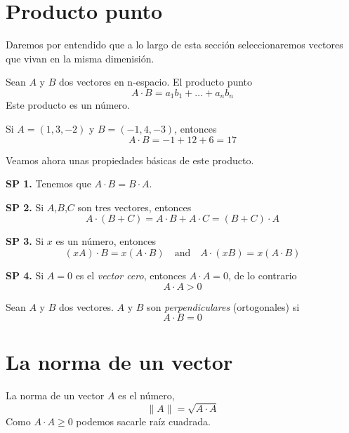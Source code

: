 \section{Producto punto}

Daremos por entendido que a lo largo de esta sección seleccionaremos vectores que vivan en la misma dimenisión.

\begin{definition}
    Sean $A$ y $B$ dos vectores en n-espacio. El producto punto
    $$ A \cdot B = a_{1}b_{1} + \ldots + a_{n}b_{n} $$
    Este producto es un número.
\end{definition}

\begin{myExample}
    Si $A=(1,3,-2)$ y $B=(-1,4,-3)$, entonces
    $$ A \cdot B = -1 + 12 + 6 = 17 $$
\end{myExample}

Veamos ahora unas propiedades básicas de este producto.

\begin{labeling}{}
    \item [\textbf{SP 1.}] Tenemos que $A \cdot B = B \cdot A$.
    \item [\textbf{SP 2.}] Si $A$,$B$,$C$ son tres vectores, entonces
        $$ A \cdot (B+C) = A \cdot B + A \cdot C = (B+C) \cdot A$$
    \item [\textbf{SP 3.}] Si $x$ es un número, entonces
        $$ (xA) \cdot B = x(A \cdot B) \quad \text{and} \quad A \cdot (xB) = x(A \cdot B) $$ 
    \item [\textbf{SP 4.}] Si $A=0$ es el \emph{vector cero}, entonces $A \cdot A = 0$, de lo contrario
        $$ A \cdot A > 0 $$
\end{labeling}

\begin{definition}
    Sean $A$ y $B$ dos vectores. $A$ y $B$ son \emph{perpendiculares} (ortogonales) si
    $$ A \cdot B = 0 $$
\end{definition}

\section{La norma de un vector}

\begin{definition}
    La norma de un vector $A$ es el número,
    $$ \| A \| = \sqrt{A \cdot A} $$
    Como $A \cdot A \ge 0$ podemos sacarle raíz cuadrada. 
\end{definition}

